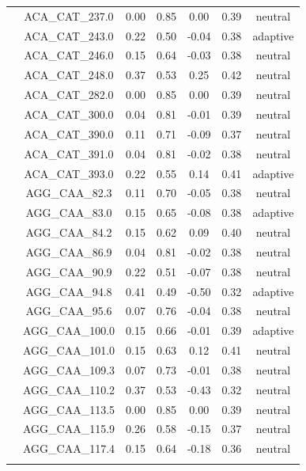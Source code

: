 \documentclass[11pt,]{article}
\begin{document}
\begin{longtable}[c]{@{}lcccccc@{}}
\\\addlinespace
& ACA\_CAT\_237.0 & 0.00 & 0.85 & 0.00 & 0.39 & neutral
\\\addlinespace
& ACA\_CAT\_243.0 & 0.22 & 0.50 & -0.04 & 0.38 & adaptive
\\\addlinespace
& ACA\_CAT\_246.0 & 0.15 & 0.64 & -0.03 & 0.38 & neutral
\\\addlinespace
& ACA\_CAT\_248.0 & 0.37 & 0.53 & 0.25 & 0.42 & neutral
\\\addlinespace
& ACA\_CAT\_282.0 & 0.00 & 0.85 & 0.00 & 0.39 & neutral
\\\addlinespace
& ACA\_CAT\_300.0 & 0.04 & 0.81 & -0.01 & 0.39 & neutral
\\\addlinespace
& ACA\_CAT\_390.0 & 0.11 & 0.71 & -0.09 & 0.37 & neutral
\\\addlinespace
& ACA\_CAT\_391.0 & 0.04 & 0.81 & -0.02 & 0.38 & neutral
\\\addlinespace
& ACA\_CAT\_393.0 & 0.22 & 0.55 & 0.14 & 0.41 & adaptive
\\\addlinespace
& AGG\_CAA\_82.3 & 0.11 & 0.70 & -0.05 & 0.38 & neutral
\\\addlinespace
& AGG\_CAA\_83.0 & 0.15 & 0.65 & -0.08 & 0.38 & adaptive
\\\addlinespace
& AGG\_CAA\_84.2 & 0.15 & 0.62 & 0.09 & 0.40 & neutral
\\\addlinespace
& AGG\_CAA\_86.9 & 0.04 & 0.81 & -0.02 & 0.38 & neutral
\\\addlinespace
& AGG\_CAA\_90.9 & 0.22 & 0.51 & -0.07 & 0.38 & neutral
\\\addlinespace
& AGG\_CAA\_94.8 & 0.41 & 0.49 & -0.50 & 0.32 & adaptive
\\\addlinespace
& AGG\_CAA\_95.6 & 0.07 & 0.76 & -0.04 & 0.38 & neutral
\\\addlinespace
& AGG\_CAA\_100.0 & 0.15 & 0.66 & -0.01 & 0.39 & adaptive
\\\addlinespace
& AGG\_CAA\_101.0 & 0.15 & 0.63 & 0.12 & 0.41 & neutral
\\\addlinespace
& AGG\_CAA\_109.3 & 0.07 & 0.73 & -0.01 & 0.38 & neutral
\\\addlinespace
& AGG\_CAA\_110.2 & 0.37 & 0.53 & -0.43 & 0.32 & neutral
\\\addlinespace
& AGG\_CAA\_113.5 & 0.00 & 0.85 & 0.00 & 0.39 & neutral
\\\addlinespace
& AGG\_CAA\_115.9 & 0.26 & 0.58 & -0.15 & 0.37 & neutral
\\\addlinespace
& AGG\_CAA\_117.4 & 0.15 & 0.64 & -0.18 & 0.36 & neutral
\\\addlinespace

\end{longtable}
\end{document}
